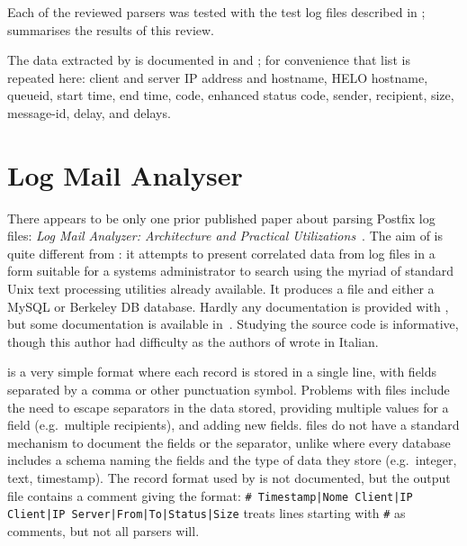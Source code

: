 Each of the reviewed parsers was tested with the \numberOFlogFILES{} test
log files described in ;  summarises the results of this review.

The data extracted by \parsername{} is documented in
 and ; for
convenience that list is repeated here: client and server IP address and
hostname, HELO hostname, queueid, start time, end time, 
code, enhanced status code, sender, recipient, size, message-id, delay, and
delays.

\section{Log Mail Analyser}

\label{log mail analyser}

There appears to be only one prior published paper about parsing Postfix
log files: \textit{Log Mail Analyzer: Architecture and Practical
Utilizations\/}~\cite{log-mail-analyser}.  The aim of  is
quite different from \parsername{}: it attempts to present correlated data
from log files in a form suitable for a systems administrator to search
using the myriad of standard Unix text processing utilities already
available.  It produces a  file and either a MySQL or Berkeley
DB database.  Hardly any documentation is provided with , but
some documentation is available in~\cite{log-mail-analyser}.  Studying the
source code is informative, though this author had difficulty as the
authors of  wrote in Italian.

 is a very simple format where each record is stored in a
single line, with fields separated by a comma or other punctuation symbol.
Problems with  files include the need to escape separators in
the data stored, providing multiple values for a field (e.g.\ multiple
recipients), and adding new fields.   files do not have a
standard mechanism to document the fields or the separator, unlike
 where every database includes a schema naming the fields and
the type of data they store (e.g.\ integer, text, timestamp).  The
 record format used by  is not documented, but
the output file contains a comment giving the format:\newline{} \texttt{\#
Timestamp|Nome Client|IP Client|IP Server|From|To|Status|Size}
\newline{} treats  lines starting with
\texttt{\#} as comments, but not all  parsers will.

